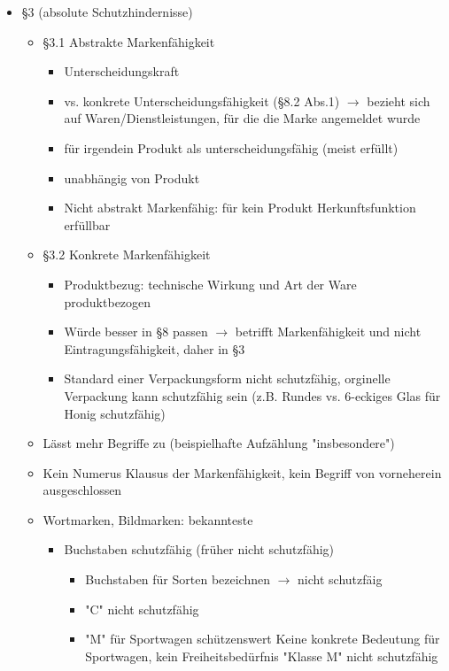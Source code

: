 \documentclass{report}
\begin{document}
\begin{itemize}
\begin{itemize}
	\end{itemize}
	\item §3 (absolute Schutzhindernisse)
	\begin{itemize}
		\item §3.1 Abstrakte Markenfähigkeit
		\begin{itemize}
			\item Unterscheidungskraft
			\item vs. konkrete Unterscheidungsfähigkeit (§8.2 Abs.1)
			\newline $\rightarrow$ bezieht sich auf Waren/Dienstleistungen, für die die Marke angemeldet wurde
			\item für irgendein Produkt als unterscheidungsfähig (meist erfüllt)
			\item unabhängig von Produkt
			\item Nicht abstrakt Markenfähig: für kein Produkt Herkunftsfunktion erfüllbar
		\end{itemize}
		\item §3.2 Konkrete Markenfähigkeit
		\begin{itemize}
			\item Produktbezug: technische Wirkung und Art der Ware produktbezogen
			\item Würde besser in §8 passen $\rightarrow$ betrifft Markenfähigkeit und nicht Eintragungsfähigkeit, daher in §3
			\item Standard einer Verpackungsform nicht schutzfähig, orginelle Verpackung kann schutzfähig sein (z.B. Rundes vs. 6-eckiges Glas für Honig schutzfähig)
		\end{itemize}
		\item Lässt mehr Begriffe zu (beispielhafte Aufzählung "insbesondere")
		\item Kein Numerus Klausus der Markenfähigkeit, kein Begriff von vorneherein ausgeschlossen
		\item Wortmarken, Bildmarken: bekannteste
		\begin{itemize}
			\item Buchstaben schutzfähig (früher nicht schutzfähig)
			\begin{itemize}
				\item Buchstaben für Sorten bezeichnen $\rightarrow$ nicht schutzfäig
				\item "C" nicht schutzfähig
				\item "M" für Sportwagen schützenswert
				\newline Keine konkrete Bedeutung für Sportwagen, kein Freiheitsbedürfnis
				\newline "Klasse M" nicht schutzfähig

\end{itemize}
\end{itemize}
\end{itemize}
\end{itemize}
\end{document}
